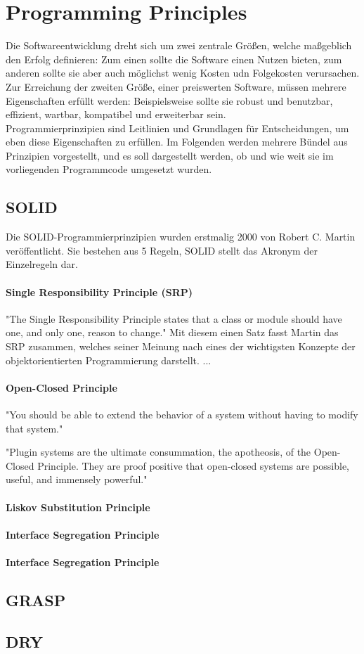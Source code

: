 \newpage

\section*{Programming Principles}
Die Softwareentwicklung dreht sich um zwei zentrale Größen, welche maßgeblich den Erfolg definieren: Zum einen sollte die Software einen Nutzen bieten, zum anderen sollte sie aber auch möglichst wenig Kosten udn Folgekosten verursachen.
Zur Erreichung der zweiten Größe, einer preiswerten Software, müssen mehrere Eigenschaften erfüllt werden: Beispielsweise sollte sie robust und benutzbar, effizient, wartbar, kompatibel und erweiterbar sein. \\
\noindent Programmierprinzipien sind Leitlinien und Grundlagen für Entscheidungen, um eben diese Eigenschaften zu erfüllen. Im Folgenden werden mehrere Bündel aus Prinzipien vorgestellt, und es soll dargestellt werden, ob und wie weit sie im vorliegenden Programmcode umgesetzt wurden.

\subsection*{SOLID}
Die SOLID-Programmierprinzipien wurden erstmalig 2000 von Robert C. Martin veröffentlicht. Sie bestehen aus 5 Regeln, SOLID stellt das Akronym der Einzelregeln dar.
\paragraph*{Single Responsibility Principle (SRP)}
"The Single Responsibility Principle states that a class or module should have one, and only one, reason to change." \cite[138]{Martin2008}
Mit diesem einen Satz fasst Martin das SRP zusammen, welches seiner Meinung nach eines der wichtigsten Konzepte der objektorientierten Programmierung darstellt.
...
\paragraph*{Open-Closed Principle}

"You should be able to extend the behavior of a system without having to modify that system."

"Plugin systems are the ultimate consummation, the apotheosis, of the Open-Closed Principle. They are proof positive that open-closed systems are possible, useful, and immensely powerful."
\paragraph*{Liskov Substitution Principle}
\paragraph*{Interface Segregation Principle}
\paragraph*{Interface Segregation Principle}



\subsection*{GRASP}


\subsection*{DRY}
